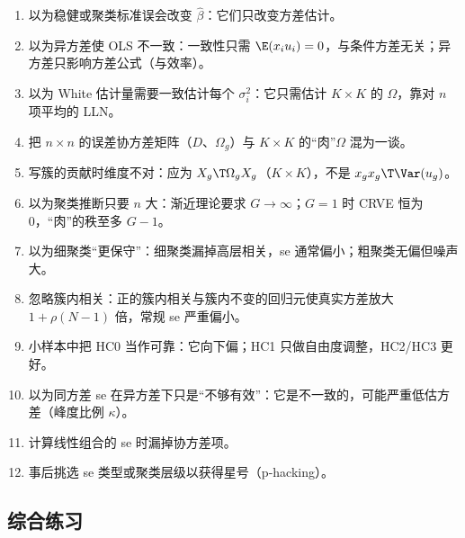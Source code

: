 \begin{enumerate}
\item 以为稳健或聚类标准误会改变 $\hat\beta$：它们只改变方差估计。
\item 以为异方差使 OLS 不一致：一致性只需 $\E(x_iu_i)=0$，与条件方差无关；异方差只影响方差公式（与效率）。
\item 以为 White 估计量需要一致估计每个 $\sigma_i^2$：它只需估计 $K\times K$ 的 $\Omega$，靠对 $n$ 项平均的 LLN。
\item 把 $n\times n$ 的误差协方差矩阵（$D$、$\Omega_g$）与 $K\times K$ 的“肉”$\Omega$ 混为一谈。
\item 写簇的贡献时维度不对：应为 $X_g\T\Omega_gX_g$（$K\times K$），不是 $x_gx_g\T\Var(u_g)$。
\item 以为聚类推断只要 $n$ 大：渐近理论要求 $G\to\infty$；$G=1$ 时 CRVE 恒为 0，“肉”的秩至多 $G-1$。
\item 以为细聚类“更保守”：细聚类漏掉高层相关，se 通常偏小；粗聚类无偏但噪声大。
\item 忽略簇内相关：正的簇内相关与簇内不变的回归元使真实方差放大 $1+\rho(N-1)$ 倍，常规 se 严重偏小。
\item 小样本中把 HC0 当作可靠：它向下偏；HC1 只做自由度调整，HC2/HC3 更好。
\item 以为同方差 se 在异方差下只是“不够有效”：它是不一致的，可能严重低估方差（峰度比例 $\kappa$）。
\item 计算线性组合的 se 时漏掉协方差项。
\item 事后挑选 se 类型或聚类层级以获得星号（p-hacking）。
\end{enumerate}

\subsection{综合练习}

